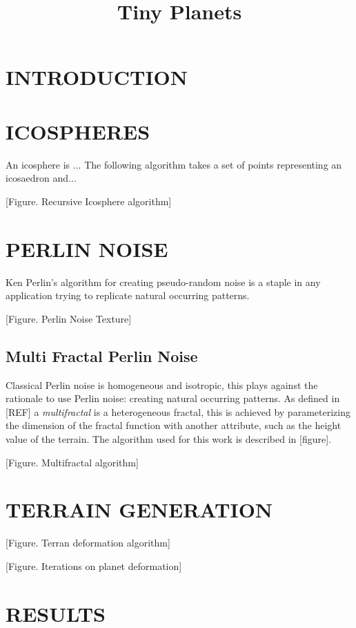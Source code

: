 \documentclass[a4paper,twoside]{article}
\begin{document}
\title{Tiny Planets}

\author{
}



\onecolumn \maketitle \normalsize \vfill

\section{\uppercase{Introduction}}
\label{sec:introduction}

\section{\uppercase{IcoSpheres}}
\label{sec:icosphere}
\noindent An icosphere is ... The following algorithm takes a set of points representing an icosaedron and...

[Figure. Recursive Icosphere algorithm]

\section{\uppercase{Perlin Noise}}
\label{sec:pnoise}
\noindent Ken Perlin's algorithm for creating pseudo-random noise is a staple in any application trying to replicate natural occurring patterns. 

[Figure. Perlin Noise Texture]

\subsection{Multi Fractal Perlin Noise}
\label{sec:mfpnois}
Classical Perlin noise is homogeneous and isotropic, this plays against the rationale to use Perlin noise: creating natural occurring patterns.  As defined in [REF] a \textit{multifractal} is a heterogeneous fractal, this is achieved by parameterizing the dimension of the fractal function with another attribute, such as the height value of the terrain. The algorithm used for this work is described in [figure].

[Figure. Multifractal algorithm]

\section{\uppercase{Terrain Generation}}
\label{sec:tgeneration}

[Figure. Terran deformation algorithm]

[Figure. Iterations on planet deformation]

\section{\uppercase{Results}}
\label{sec:results}

\vfill
\end{document}
